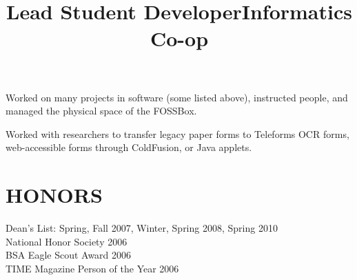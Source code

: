 \documentclass[line]{res}
\begin{document}
\begin{resume}
    \title{Lead Student Developer}
    \begin{position}
        Worked on many projects in software (some listed above), instructed
        people, and managed the physical space of the FOSSBox.
    \end{position}

    \title{Informatics Co-op}
    \begin{position}
        Worked with researchers to transfer legacy paper forms to Teleforms OCR
        forms, web-accessible forms through ColdFusion, or Java applets.
    \end{position}

\section{HONORS}
    Dean's List: Spring, Fall 2007, Winter, Spring 2008, Spring 2010 \\
    National Honor Society 2006 \\
    BSA Eagle Scout Award 2006 \\
    TIME Magazine Person of the Year 2006

\end{resume}
\end{document}
